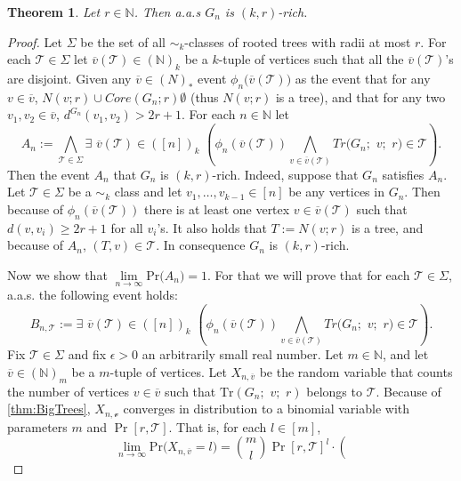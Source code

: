\documentclass[12pt,notitlepage,a4paper]{article}
\newtheorem{theorem}{Theorem}[section]
\theoremstyle{definition}
\newcommand{\N}{\mathbb{N}}
\newcommand{\Ln}{\lim\limits_{n\to \infty}}
\newcommand{\PR}[1]{\mathrm{Pr}\big(#1\big)}
\begin{document}
	\begin{theorem}\label{thm:rich}
		Let $r\in \N$. Then a.a.s $G_n$ is $(k,r)$-rich.
	\end{theorem}
	\begin{proof}
		Let $\Sigma$ be the set of all $\sim_k$-classes of rooted trees
		with radii at most $r$. For each $\mathcal{T}\in \Sigma$
		let $\overline{v}(\mathcal{T})\in (\N)_k$ be a $k$-tuple of 
		vertices such that all the $\overline{v}(\mathcal{T})$'s are
		disjoint. Given any $\overline{v}\in (N)_*$
		event $\phi_n\big(\overline{v}(\mathcal{T})\big)$ as the event that
		for any $v\in \overline{v}$, $N(v;r)\cup Core(G_n;r)\emptyset$ 
		(thus $N(v;r)$ is a tree),
		and that for any two $v_1,v_2\in \overline{v}$, 
		$d^{G_n}(v_1,v_2)>2r+1$. For each $n\in \N$ let
		\[
		A_n:=\bigwedge_{\mathcal{T}\in \Sigma} 
		\exists\,\, \overline{v}(\mathcal{T}) \in ([n])_k\,\,
		 \left(
		\phi_n(\overline{v}(\mathcal{T})) \bigwedge_{
		v\in \overline{v}(\mathcal{T})} 
		Tr\big(
		G_n;\,\,v;\,\,r
		\big)\in \mathcal{T}
		\right).
		\]
		Then the event $A_n$ that $G_n$ is $(k,r)$-rich.
		Indeed, suppose that $G_n$ satisfies
		$A_n$. Let $\mathcal{T}\in \Sigma$ be a $\sim_k$ class and let 
		$v_1,\dots,v_{k-1}\in [n]$ be any vertices in $G_n$. Then because of
		$\phi_n(\overline{v}(\mathcal{T}))$ there is at least
		one vertex $v\in \overline{v}(\mathcal{T})$ such that $d(v,v_i)\geq 2r+1$
		for all $v_i$'s. It also holds that $T:=N(v;r)$ is a tree, and because of
		$A_n$, $(T,v)\in \mathcal{T}$. In consequence $G_n$ is $(k,r)$-rich.\par
		Now we show that $\Ln \PR{A_n}=1$. For that we will prove that for
		each $\mathcal{T}\in \Sigma$, a.a.s. the following event holds:
		\[
		B_{n,\mathcal{T}}:=
		\exists\,\, \overline{v}(\mathcal{T}) \in ([n])_k\,\,
		\left(
		\phi_n(\overline{v}(\mathcal{T})) \bigwedge_{
			v\in \overline{v}(\mathcal{T})} 
		Tr\big(
		G_n;\,\,v;\,\,r
		\big)\in \mathcal{T}
		\right).
		\]
		Fix $\mathcal{T}\in \Sigma$ and fix $\epsilon>0$ an arbitrarily 
		small real number. Let $m\in \N$,
		and let $\overline{v}\in (\N)_m$ be a $m$-tuple of vertices. Let 
		$X_{n,\overline{v}}$ be the random variable that counts the number of 
		vertices $v\in \overline{v}$ such that $\mathrm{Tr}(G_n;\,\,v;\,\,r)$
		belongs to $\mathcal{T}$. Because of \cref{thm:BigTrees}, $X_{n,\mathcal{v}}$
		converges in distribution to a binomial variable with parameters $m$ and
		$\Pr[r, \mathcal{T}]$. That is, for each $l\in [m]$,
		\[
		\Ln \PR{X_{n,\overline{v}}=l}= \binom{m}{l} \Pr[r, \mathcal{T}]^l \cdot \left(
\]
\end{proof}
\end{document}
